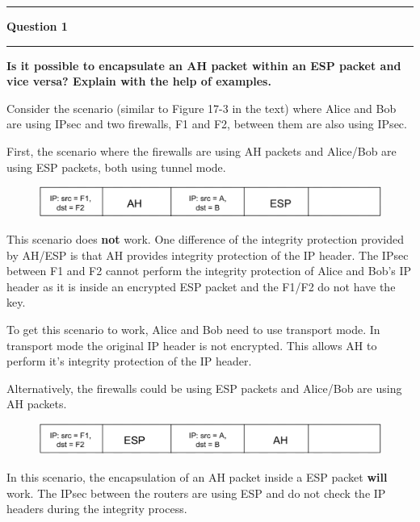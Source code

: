 \documentclass[11pt]{article}
\newcommand\question[2]{\vspace{.25in}\hrule\textbf{#1}\vspace{.5em}\hrule\vspace{.10in}}
\renewcommand\part[1]{\vspace{.10in}\textbf{(#1)}}
\begin{document}
\raggedright
\newcommand\NAME{Jake Pitkin}  %
\newcommand\UID{u0891770}     %
\newcommand\HWNUM{5}              %

\question{Question 1}

\part{a} \textbf{Is it possible to encapsulate an AH packet within an ESP packet and vice versa? Explain with the help of examples.}

Consider the scenario (similar to Figure 17-3 in the text) where Alice and Bob are using IPsec and two firewalls, F1 and F2, between them are also using IPsec.

First, the scenario where the firewalls are using AH packets and Alice/Bob are using ESP packets, both using tunnel mode.

\begin{figure}[H]
  \centerline{\includegraphics[width=0.5\linewidth]{hw5_1b_1.png}}
\end{figure}

This scenario does \textbf{not} work. One difference of the integrity protection provided by AH/ESP is that AH provides integrity protection of the IP header. The IPsec between F1 and F2 cannot perform the integrity protection of Alice and Bob's IP header as it is inside an encrypted ESP packet and the F1/F2 do not have the key.

To get this scenario to work, Alice and Bob need to use transport mode. In transport mode the original IP header is not encrypted. This allows AH to perform it's integrity protection of the IP header.

Alternatively, the firewalls could be using ESP packets and Alice/Bob are using AH packets.

\begin{figure}[H]
  \centerline{\includegraphics[width=0.5\linewidth]{hw5_1b_2.png}}
\end{figure}

In this scenario, the encapsulation of an AH packet inside a ESP packet \textbf{will} work. The IPsec between the routers are using ESP and do not check the IP headers during the integrity process.
\end{document}
